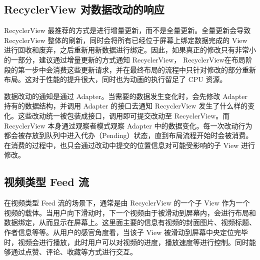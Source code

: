 
\subsection{RecyclerView 对数据改动的响应}

RecyclerView 最推荐的方式是进行增量更新，而不是全量更新。全量更新会导致 RecyclerView 整体的刷新，同时会将所有已经位于屏幕上绑定数据完成的 View 进行回收和废弃，之后重新用新数据进行绑定。因此，如果真正的修改只有非常小的一部分，建议通过增量更新的方式通知 RecyclerView， RecyclerView在布局阶段的第一步中会消费这些更新请求，并在最终布局的流程中只针对修改的部分重新布局。这对于性能的提升很大，同时也为动画的执行留足了 CPU 资源。

数据改动的通知是通过 Adapter。当需要的数据发生变化时，会先修改 Adapter 持有的数据结构，并调用 Adapter 的接口去通知 RecyclerView 发生了什么样的变化。这些改动统一被包装成接口，调用即可提交改动至 RecyclerView。而 RecyclerView 本身通过观察者模式观察 Adapter 中的数据变化。每一次改动行为都会被存放到队列中进入代办（Pending）状态，直到布局流程开始时会被消费。在消费的过程中，也只会通过改动中提交的位置信息对可能受影响的子 View 进行修改。

\subsection{视频类型 Feed 流}

在视频类型 Feed 流的场景下，通常是由 RecyclerView 的一个子 View 作为一个视频的载体。当用户向下滑动时，下一个视频由于被滑动到屏幕内，会进行布局和数据绑定，从而显示在屏幕上。这里面主要的信息有视频的封面图片、视频标题、作者信息等等。从用户的感官角度看，当该子 View 被滑动到屏幕中央定位完毕时，视频会进行播放，此时用户可以对视频的进度，播放速度等进行控制。同时能够通过点赞、评论、收藏等方式进行交互。


